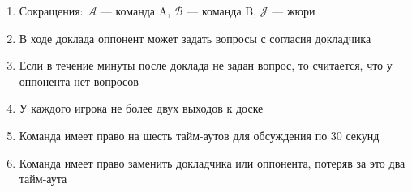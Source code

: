 \documentclass{article}
\begin{document}
\vfill

\begin{enumerate}
\item Сокращения: $\mathcal{A}$ --- команда A, $\mathcal{B}$ --- команда B, $\mathcal{J}$ --- жюри
\item В ходе доклада оппонент может задать вопросы с согласия докладчика
\item Если в течение минуты после доклада не задан вопрос, то считается, что у оппонента нет вопросов
\item У каждого игрока не более двух выходов к доске
\item Команда имеет право на шесть тайм-аутов для обсуждения по 30 секунд
\item Команда имеет право заменить докладчика или оппонента, потеряв за это два тайм-аута

\end{enumerate}
\end{document}
